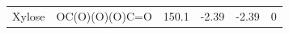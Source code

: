 \begin{footnotesize}
\begin{longtable}{>{\raggedright\arraybackslash}p{3.5cm} >{\raggedright\arraybackslash\ttfamily}p{5.8cm} c c c c}
Xylose & O\allowbreak C\allowbreak (\allowbreak O\allowbreak )\allowbreak (\allowbreak O\allowbreak )\allowbreak (\allowbreak O\allowbreak )\allowbreak C\allowbreak =\allowbreak O & 150.1 & -2.39 & -2.39 & 0 \\
\end{longtable}
\end{footnotesize}